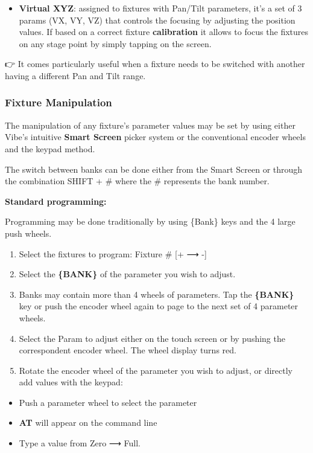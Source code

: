 \documentclass[
]{article}
\providecommand{\tightlist}{%
  \setlength{\itemsep}{0pt}\setlength{\parskip}{0pt}}
\begin{document}
\begin{itemize}
\tightlist
\item
  \textbf{Virtual XYZ}: assigned to fixtures with Pan/Tilt parameters, it's a set of 3 params (VX, VY, VZ) that controls the focusing by adjusting the position values. If based on a correct fixture \textbf{calibration} it allows to focus the fixtures on any stage point by simply tapping on the screen.
\end{itemize}

👉 It comes particularly useful when a fixture needs to be switched with another having a different Pan and Tilt range.

\hypertarget{fixture-manipulation}{%
\subsubsection{Fixture Manipulation}\label{fixture-manipulation}}

The manipulation of any fixture's parameter values may be set by using either Vibe's intuitive \textbf{Smart Screen} picker system or the conventional encoder wheels and the keypad method.

The switch between banks can be done either from the Smart Screen or through the combination SHIFT + \# where the \# represents the bank number.

\textbf{Standard programming:}

Programming may be done traditionally by using \{Bank\} keys and the 4 large push wheels.

\begin{enumerate}
\def\labelenumi{\arabic{enumi}.}
\item
  Select the fixtures to program: Fixture \# {[}+ ⟶ -{]}
\item
  Select the \textbf{\{BANK\}} of the parameter you wish to adjust.
\item
  Banks may contain more than 4 wheels of parameters. Tap the \textbf{\{BANK\}} key or push the encoder wheel again to page to the next set of 4 parameter wheels.
\item
  Select the Param to adjust either on the touch screen or by pushing the correspondent encoder wheel. The wheel display turns red.
\item
  Rotate the encoder wheel of the parameter you wish to adjust, or directly add values with the keypad:
\end{enumerate}

\begin{itemize}
\tightlist
\item
  Push a parameter wheel to select the parameter
\item
  \textbf{AT} will appear on the command line
\item
  Type a value from Zero ⟶ Full.
\end{itemize}
\end{document}
